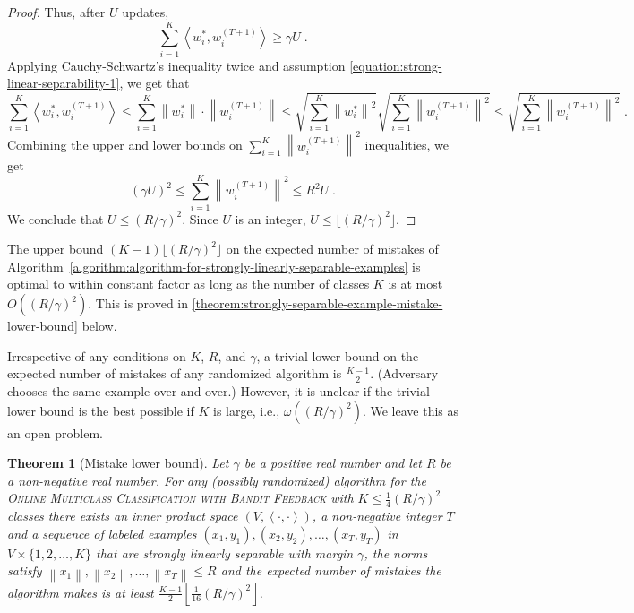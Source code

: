 \documentclass[12pt]{article}
\newtheorem{theorem}[definition]{Theorem}
\newcommand{\ip}[2]{\left\langle #1, #2 \right\rangle} %
\newcommand{\norm}[1]{\left\| #1 \right\|}  %
\begin{document}
\begin{proof}
Thus, after $U$ updates,
$$
\sum_{i=1}^K \ip{w_i^*}{w_i^{(T+1)}} \ge \gamma U \; .
$$
Applying Cauchy-Schwartz's inequality twice and assumption
\eqref{equation:strong-linear-separability-1}, we get that
$$
\sum_{i=1}^K \ip{w_i^*}{w_i^{(T+1)}}
\le \sum_{i=1}^K \norm{w_i^*} \cdot \norm{w_i^{(T+1)}}
\le \sqrt{\sum_{i=1}^K \norm{w_i^*}^2} \sqrt{\sum_{i=1}^K \norm{w_i^{(T+1)}}^2}
\le \sqrt{\sum_{i=1}^K \norm{w_i^{(T+1)}}^2} \; .
$$
Combining the upper and lower bounds on $\sum_{i=1}^K \norm{w_i^{(T+1)}}^2$ inequalities, we get
$$
(\gamma U)^2 \le \sum_{i=1}^K \norm{w_i^{(T+1)}}^2 \le R^2 U \; .
$$
We conclude that $U \le (R/\gamma)^2$. Since $U$ is an integer, $U \le \lfloor (R/\gamma)^2 \rfloor$.
\end{proof}

The upper bound $(K-1) \lfloor (R/\gamma)^2 \rfloor$ on the expected number of
mistakes of
Algorithm~\ref{algorithm:algorithm-for-strongly-linearly-separable-examples} is
optimal to within constant factor as long as the number of classes $K$ is
at most $O((R/\gamma)^2)$. This is proved in
\autoref{theorem:strongly-separable-example-mistake-lower-bound} below.

Irrespective of any conditions on $K$, $R$, and $\gamma$, a trivial lower bound
on the expected number of mistakes of any randomized algorithm is
$\frac{K-1}{2}$. (Adversary chooses the same example over and over.) However, it
is unclear if the trivial lower bound is the best possible if $K$ is large,
i.e., $\omega((R/\gamma)^2)$. We leave this as an open problem.

\begin{theorem}[Mistake lower bound]
\label{theorem:strongly-separable-example-mistake-lower-bound}
Let $\gamma$ be a positive real number and let $R$ be a non-negative real
number. For any (possibly randomized) algorithm for the \textsc{Online
Multiclass Classification with Bandit Feedback} with $K \le
\frac{1}{4}(R/\gamma)^2$ classes there exists an inner product space $(V,
\ip{\cdot}{\cdot})$, a non-negative integer $T$ and a sequence of labeled
examples $(x_1, y_1), (x_2, y_2), \dots, (x_T, y_T)$ in $V \times
\{1,2,\dots,K\}$ that are strongly linearly separable with margin $\gamma$, the
norms satisfy $\norm{x_1}, \norm{x_2}, \dots, \norm{x_T} \le R$ and the expected
number of mistakes the algorithm makes is at least $\frac{K-1}{2} \left\lfloor
\frac{1}{16} (R/\gamma)^2 \right\rfloor$.
\end{theorem}
\end{document}
